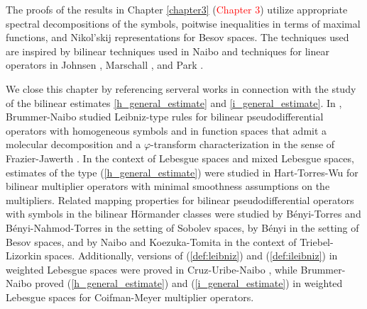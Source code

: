 
The proofs of the results in Chapter \ref{chapter3} (\textcolor{red}{Chapter 3}) utilize appropriate spectral decompositions of the symbols, poitwise inequalities in terms of maximal functions, and Nikol'skij representations for Besov spaces. The techniques used are inspired by bilinear techniques used in Naibo \cite{MR3393696} and techniques for linear operators in Johnsen \citep{MR2163627}, Marschall \citep{MR1376592}, and Park \citep{Park}. 

We close this chapter by referencing serveral works in connection with the study of the bilinear estimates \eqref{h_general_estimate} and \eqref{i_general_estimate}. In \cite{MR3750234}, Brummer-Naibo studied Leibniz-type rules for bilinear pseudodifferential operators with homogeneous symbols and in function spaces that admit a molecular decomposition and a $\varphi$-transform characterization in the sense of Frazier-Jawerth \cite{MR808825, MR1070037}. In the context of Lebesgue spaces and mixed Lebesgue spaces, estimates of the type (\ref{h_general_estimate}) were studied in Hart-Torres-Wu \cite{HTW} for bilinear multiplier operators with minimal smoothness assumptions on the multipliers. Related mapping properties for bilinear pseudodifferential operators with symbols in the bilinear H\"ormander classes were studied by B\'enyi-Torres \cite{MR1986065} and B\'enyi-Nahmod-Torres \cite{MR2250054} in the setting of Sobolev spaces, by B\'enyi \cite{MR1996120} in the setting of Besov spaces, and by Naibo \cite{MR3393696} and Koezuka-Tomita \cite{MR3750316} in the context of Triebel-Lizorkin spaces. Additionally, versions of (\ref{def:leibniz}) and (\ref{def:ileibniz}) in weighted Lebesgue spaces were proved in Cruz-Uribe-Naibo \cite{MR3513582}, while Brummer-Naibo \cite{BrNa2017} proved (\ref{h_general_estimate}) and (\ref{i_general_estimate}) in weighted Lebesgue spaces for Coifman-Meyer multiplier operators. 



